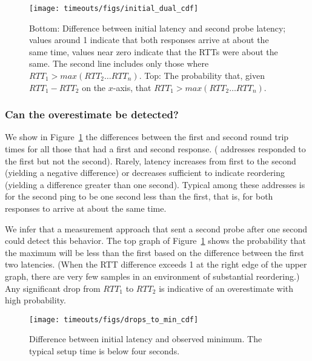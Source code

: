 \begin{figure}[tb]
\begin{center}
\texttt{[image: timeouts/figs/initial\_dual\_cdf]}
\end{center}
\caption[The first response often has the largest RTT]{\label{fig:initial_drops_cdf}Bottom: Difference between initial latency and second probe latency; values around 1 indicate that both responses arrive at about the same time, values near zero indicate that the RTTs were about the same.  The second line includes only those where $RTT_1 > max(RTT_2 \ldots RTT_n)$.  Top: The probability that, given $RTT_1 - RTT_2$ on the $x$-axis, that $RTT_1 > max(RTT_2 \ldots RTT_n)$.}
\end{figure}


\subsubsection*{Can the overestimate be detected?}  We show in 
Figure~\ref{fig:initial_drops_cdf} the differences between the
first and second round trip times for all those that had a 
first and second response. (\countSecondProbeNoResponse{} 
addresses responded to the first but not the second).  Rarely,
latency increases from first to the second (yielding a negative 
difference) or decreases sufficient to indicate reordering (yielding 
a difference greater than one second).  Typical among these 
addresses is for the second ping to be one second less than the first, that
is, for both responses to arrive at about the same time.

We infer that a measurement approach that sent a second
probe after one second could detect this behavior.  The top
graph of Figure~\ref{fig:initial_drops_cdf} shows the
probability that the maximum will be less than the first based on the difference
between the first two latencies.  (When the RTT difference
exceeds 1 at the right edge of the upper graph, there are very
few samples in an environment of substantial reordering.)
Any significant drop from $RTT_1$ to $RTT_2$ is
indicative of an overestimate with high probability.

\begin{figure}[tb]
\begin{center}
\texttt{[image: timeouts/figs/drops\_to\_min\_cdf]}
\end{center}
\caption[Difference between initial RTT and observed minimum]{\label{fig:drops_to_min}Difference between initial latency and observed minimum.  The typical setup time is below four seconds.}
\end{figure}

